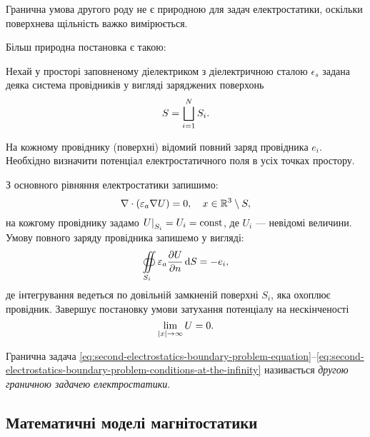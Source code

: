 Гранична умова другого роду не є природною для задач електростатики, оскільки поверхнева щільність важко вимірюється. \medskip

Більш природна постановка є такою:
\begin{example}
	Нехай у просторі заповненому діелектриком з діелектричною сталою $\epsilon_s$ задана деяка система провідників у вигляді заряджених поверхонь
	\begin{equation}
		S = \displaystyle\bigsqcup\limits_{i = 1}^N S_i.
	\end{equation}

	На кожному провіднику (поверхні) відомий повний заряд провідника $e_i$. Необхідно визначити потенціал електростатичного поля в усіх точках простору.
\end{example}

З основного рівняння електростатики запишимо:
\begin{equation}
    \label{eq:second-electrostatics-boundary-problem-equation}
	\nabla \cdot (\varepsilon_a \nabla U) = 0, \quad x \in \mathbb{R}^3 \setminus S,
\end{equation}
на кожгому провіднику задамо $\left. U \right|_{S_i} = U_i = \operatorname{const}$, де $U_i$ --- невідомі величини. Умову повного заряду провідника запишемо у вигляді: 
\begin{equation}
    \label{eq:second-electrostatics-boundary-problem-boundary-conditions}
	\displaystyle\oiint\limits_{S_i} \varepsilon_a \frac{\partial U}{\partial n} \mathop{}\!\mathrm{d} S = -e_i,
\end{equation}
де інтегрування ведеться по довільній замкненій поверхні ${S_i}$, яка охоплює провідник.
Завершує постановку  умови затухання потенціалу на нескінченості
\begin{equation}
    \label{eq:second-electrostatics-boundary-problem-conditions-at-the-infinity}
	\displaystyle\lim\limits_{|x| \to \infty} U = 0.
\end{equation}

\begin{definition}
	Гранична задача \eqref{eq:second-electrostatics-boundary-problem-equation}--\eqref{eq:second-electrostatics-boundary-problem-conditions-at-the-infinity} називається \textit{другою граничною задачею електростатики}.
\end{definition}

\subsection{Математичні моделі магнітостатики}

